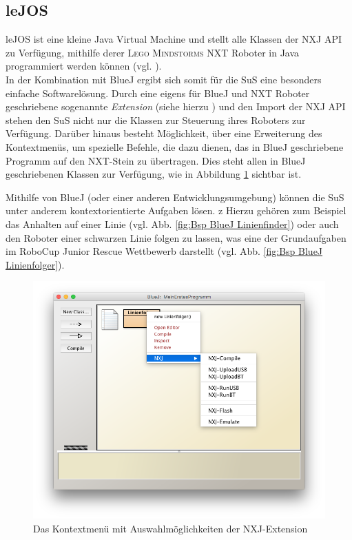 \documentclass[paper=a4, DIV=calc, BCOR=15mm, twoside=on, onecolumn=on, open = right, titlepage =on, parskip =half, headsepline = on, footsepline = on, chapterprefix = off, appendixprefix = off, fontsize = 12pt, numbers = noenddot, abstract = on]{scrbook}
\begin{document}
\subsection{leJOS}
\label{sec:lejos}
\onehalfspacing
leJOS ist eine kleine Java Virtual Machine und stellt alle Klassen der NXJ API zu Verfügung, mithilfe derer \textsc{Lego Mindstorms} NXT Roboter in Java programmiert werden können (vgl. \cite{lejos}).\\
In der Kombination mit BlueJ ergibt sich somit für die SuS eine besonders einfache Softwarelösung. Durch eine eigens für BlueJ und NXT Roboter geschriebene sogenannte \textit{Extension} (siehe hierzu \cite{bowes:12}) und den Import der NXJ API stehen den SuS nicht nur die Klassen zur Steuerung ihres Roboters zur Verfügung. Darüber hinaus besteht Möglichkeit, über eine Erweiterung des Kontextmenüs, um spezielle Befehle, die dazu dienen, das in BlueJ geschriebene Programm auf den NXT-Stein zu übertragen. Dies steht allen in BlueJ geschriebenen Klassen zur Verfügung, wie in Abbildung \ref{fig:extension} sichtbar ist.
\pagebreak

Mithilfe von BlueJ (oder einer anderen Entwicklungsumgebung) können die SuS unter anderem kontextorientierte Aufgaben lösen. z Hierzu gehören zum Beispiel das Anhalten auf einer Linie (vgl. Abb. \ref{fig:Bsp BlueJ Linienfinder}) oder auch den Roboter einer schwarzen Linie folgen zu lassen, was eine der Grundaufgaben im RoboCup Junior Rescue Wettbewerb darstellt (vgl. Abb. \ref{fig:Bsp BlueJ Linienfolger}).

\begin{figure}[htbp]
\centering
\includegraphics[width=\textwidth]{images/extension.png}
\caption{Das Kontextmenü mit Auswahlmöglichkeiten der NXJ-Extension}
\label{fig:extension}
\end{figure}
\end{document}

